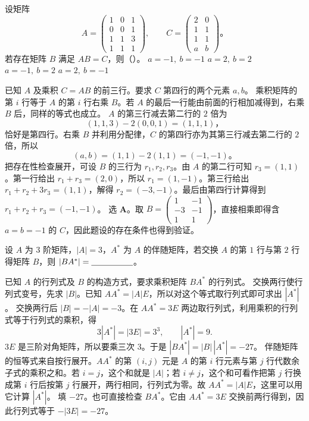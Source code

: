 \documentclass[UTF8,zihao=-4,fontset=fandol]{ctexart}
\begin{document}
设矩阵
\[
A=\begin{pmatrix}1&0&1\\0&0&1\\1&1&3\\1&1&1\end{pmatrix},
\qquad C=\begin{pmatrix}2&0\\1&1\\1&1\\a&b\end{pmatrix}\text{。}
\]
若存在矩阵 $B$ 满足 $AB=C$，则（\quad）。
\Choices
  {$a=-1,\ b=-1$}
  {$a=2,\ b=2$}
  {$a=-1,\ b=2$}
  {$a=2,\ b=-1$}

\Solution
\Known 已知 $A$ 及乘积 $C=AB$ 的前三行。要求 $C$ 第四行的两个元素 $a,b$。
\Method 乘积矩阵的第 $i$ 行等于 $A$ 的第 $i$ 行右乘 $B$。若 $A$ 的最后一行能由前面的行相加减得到，右乘 $B$ 后，同样的等式也成立。
\Derive $A$ 的第三行减去第二行的 $2$ 倍为
\[
(1,1,3)-2(0,0,1)=(1,1,1)\text{，}
\]
恰好是第四行。右乘 $B$ 并利用分配律，$C$ 的第四行亦为其第三行减去第二行的 $2$ 倍，所以
\[
(a,b)=(1,1)-2(1,1)=(-1,-1)\text{。}
\]
把存在性检查展开，可设 $B$ 的三行为 $r_1,r_2,r_3$。由 $A$ 的第二行可知 $r_3=(1,1)$。第一行给出 $r_1+r_3=(2,0)$，所以 $r_1=(1,-1)$。第三行给出 $r_1+r_2+3r_3=(1,1)$，解得 $r_2=(-3,-1)$。最后由第四行计算得到 $r_1+r_2+r_3=(-1,-1)$。
\Verify 选 \textbf{A}。取 $B=\begin{pmatrix}1&-1\\-3&-1\\1&1\end{pmatrix}$，直接相乘即得含 $a=b=-1$ 的 $C$，因此题设的存在条件也得到验证。

设 $A$ 为 $3$ 阶矩阵，$|A|=3$，$A^*$ 为 $A$ 的伴随矩阵，若交换 $A$ 的第 $1$ 行与第 $2$ 行得矩阵 $B$，则 $|BA^*|=\underline{\hspace{5em}}$。

\Solution
\Known 已知 $A$ 的行列式及 $B$ 的构造方式，要求乘积矩阵 $BA^*$ 的行列式。
\Method 交换两行使行列式变号，先求 $|B|$。已知 $AA^*=|A|E$，所以对这个等式取行列式即可求出 $|A^*|$。
\Derive 交换两行后 $|B|=-|A|=-3$。在 $AA^*=3E$ 两边取行列式，利用乘积的行列式等于行列式的乘积，得
\[
3|A^*|=|3E|=3^3,\qquad |A^*|=9.
\]
$3E$ 是三阶对角矩阵，所以要乘三次 $3$。于是 $|BA^*|=|B|\,|A^*|=-27$。
伴随矩阵的恒等式来自按行展开。$AA^*$ 的第 $(i,j)$ 元是 $A$ 的第 $i$ 行元素与第 $j$ 行代数余子式的乘积之和。若 $i=j$，这个和就是 $|A|$；若 $i\ne j$，这个和可看作把第 $j$ 行换成第 $i$ 行后按第 $j$ 行展开，两行相同，行列式为零。故 $AA^*=|A|E$，这里可以用它计算 $|A^*|$。
\Verify 填 $\boxed{-27}$。也可直接检查 $BA^*$。它由 $AA^*=3E$ 交换前两行得到，因此行列式等于 $-|3E|=-27$。
\end{document}
